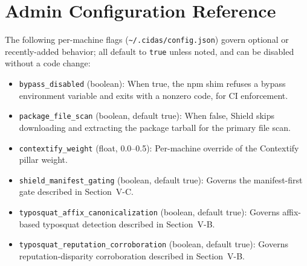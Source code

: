\documentclass[journal]{IEEEtran}
\begin{document}
\section{Admin Configuration Reference}
The following per-machine flags (\texttt{\textasciitilde/.cidas/config.json}) govern optional or
recently-added behavior; all default to \texttt{true} unless noted, and can be disabled without a code change:
\begin{itemize}
\item \texttt{bypass\_disabled} (boolean): When true, the npm shim refuses a bypass environment variable and
exits with a nonzero code, for CI enforcement.
\item \texttt{package\_file\_scan} (boolean, default true): When false, Shield skips downloading and
extracting the package tarball for the primary file scan.
\item \texttt{contextify\_weight} (float, 0.0--0.5): Per-machine override of the Contextify pillar weight.
\item \texttt{shield\_manifest\_gating} (boolean, default true): Governs the manifest-first gate described in
Section~V-C.
\item \texttt{typosquat\_affix\_canonicalization} (boolean, default true): Governs affix-based typosquat
detection described in Section~V-B.
\item \texttt{typosquat\_reputation\_corroboration} (boolean, default true): Governs reputation-disparity
corroboration described in Section~V-B.
\end{itemize}
\end{document}
